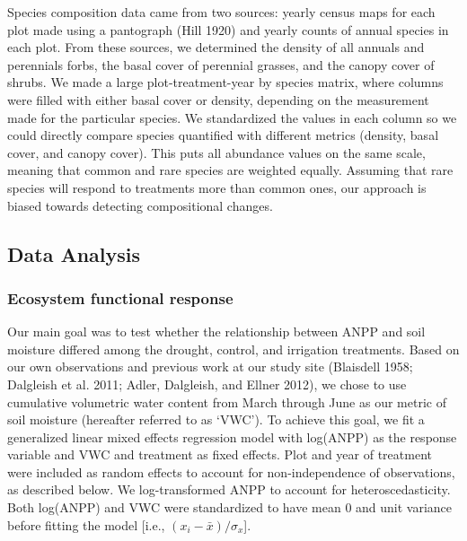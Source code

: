 \documentclass[fleqn,10pt,lineno]{wlpeerj} %
\begin{document}
Species composition data came from two sources: yearly census maps for
each plot made using a pantograph (Hill 1920) and yearly counts of
annual species in each plot.
From these sources, we determined the density of all annuals and
perennials forbs, the basal cover of perennial grasses, and the canopy
cover of shrubs. We made a large plot-treatment-year by species matrix,
where columns were filled with either basal cover or density, depending
on the measurement made for the particular species. We standardized the
values in each column so we could directly compare species quantified
with different metrics (density, basal cover, and canopy cover). This
puts all abundance values on the same scale, meaning that common and
rare species are weighted equally. Assuming that rare species will
respond to treatments more than common ones, our approach is biased
towards detecting compositional changes.

\hypertarget{data-analysis}{%
\subsection{Data Analysis}\label{data-analysis}}

\hypertarget{ecosystem-functional-response}{%
\subsubsection{Ecosystem functional
response}\label{ecosystem-functional-response}}

Our main goal was to test whether the relationship between ANPP and soil
moisture differed among the drought, control, and irrigation treatments.
Based on our own observations and previous work at our study site
(Blaisdell 1958; Dalgleish et al. 2011; Adler, Dalgleish, and Ellner
2012), we chose to use cumulative volumetric water content from March
through June as our metric of soil moisture (hereafter referred to as
`VWC'). To achieve this goal, we fit a generalized linear mixed effects
regression model with log(ANPP) as the response variable and VWC and
treatment as fixed effects. Plot and year of treatment were included as
random effects to account for non-independence of observations, as
described below. We log-transformed ANPP to account for
heteroscedasticity. Both log(ANPP) and VWC were standardized to have
mean 0 and unit variance before fitting the model {[}i.e.,
\((x_i - \bar{x})/\sigma_x\){]}.
\end{document}
